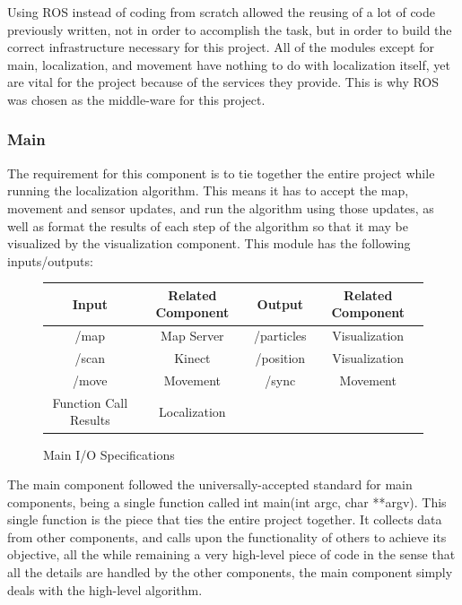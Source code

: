 \documentclass{article}
\newcommand\tab[1][0.5cm]{\hspace*{#1}}
\newcounter{subsubsubsection}[subsubsection]
\begin{document}
Using ROS instead of coding from scratch allowed the reusing of a lot of code previously written, not in order to accomplish the task, but in order to build the correct infrastructure necessary for this project. All of the modules except for main, localization, and movement have nothing to do with localization itself, yet are vital for the project because of the services they provide. This is why ROS was chosen as the middle-ware for this project.


\subsubsection{Main}
\tab The requirement for this component is to tie together the entire project while running the localization algorithm. This means it has to accept the map, movement and sensor updates, and run the algorithm using those updates, as well as format the results of each step of the algorithm so that it may be visualized by the visualization component. This module has the following inputs/outputs:

\begin{figure}[h!]
\centering
 \begin{tabular}{||c c c c||} 
 \hline
 Input & Related Component & Output & Related Component \\ [0.5ex] 
 \hline\hline
 /map & Map Server & /particles & Visualization \\ 
 \hline
 /scan & Kinect & /position & Visualization \\
 \hline
 /move & Movement & /sync & Movement  \\
 \hline
 Function Call Results & Localization & & \\ 
 \hline
\end{tabular}
\caption{Main I/O Specifications}
\label{fig:MainIO}
\end{figure}

\tab The main component followed the universally-accepted standard for main components, being a single function called int main(int argc, char **argv). This single function is the piece that ties the entire project together. It collects data from other components, and calls upon the functionality of others to achieve its objective, all the while remaining a very high-level piece of code in the sense that all the details are handled by the other components, the main component simply deals with the high-level algorithm.\\
\end{document}
